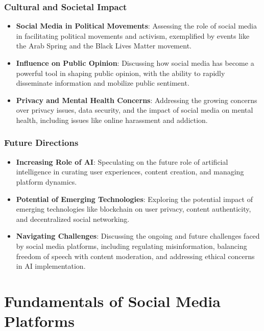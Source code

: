 \documentclass[
]{book}
\providecommand{\tightlist}{%
  \setlength{\itemsep}{0pt}\setlength{\parskip}{0pt}}
\begin{document}
\hypertarget{cultural-and-societal-impact}{%
\subsection*{Cultural and Societal Impact}\label{cultural-and-societal-impact}}

\begin{itemize}
\tightlist
\item
  \textbf{Social Media in Political Movements}: Assessing the role of social media in facilitating political movements and activism, exemplified by events like the Arab Spring and the Black Lives Matter movement.
\item
  \textbf{Influence on Public Opinion}: Discussing how social media has become a powerful tool in shaping public opinion, with the ability to rapidly disseminate information and mobilize public sentiment.
\item
  \textbf{Privacy and Mental Health Concerns}: Addressing the growing concerns over privacy issues, data security, and the impact of social media on mental health, including issues like online harassment and addiction.
\end{itemize}

\hypertarget{future-directions}{%
\subsection*{Future Directions}\label{future-directions}}

\begin{itemize}
\tightlist
\item
  \textbf{Increasing Role of AI}: Speculating on the future role of artificial intelligence in curating user experiences, content creation, and managing platform dynamics.
\item
  \textbf{Potential of Emerging Technologies}: Exploring the potential impact of emerging technologies like blockchain on user privacy, content authenticity, and decentralized social networking.
\item
  \textbf{Navigating Challenges}: Discussing the ongoing and future challenges faced by social media platforms, including regulating misinformation, balancing freedom of speech with content moderation, and addressing ethical concerns in AI implementation.
\end{itemize}

\hypertarget{fundamentals-of-social-media-platforms}{%
\chapter{Fundamentals of Social Media Platforms}\label{fundamentals-of-social-media-platforms}}
\end{document}
